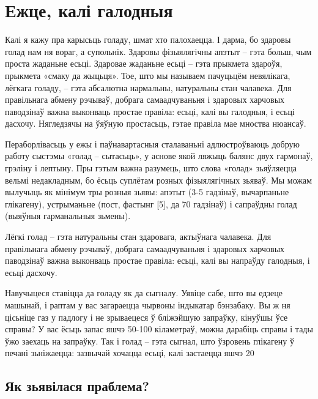 \chapter{Ежце, калі галодныя}

Калі я кажу пра карысьць голаду, шмат хто палохаецца. І дарма, бо здаровы голад нам ня вораг, а супольнік. Здаровы фізыялягічны апэтыт – гэта больш, чым проста жаданьне есьці. Здаровае жаданьне есьці – гэта прыкмета здароўя, прыкмета «смаку да жыцьця». Тое, што мы называем пачуцьцём невялікага, лёгкага голаду, – гэта абсалютна нармальны, натуральны стан чалавека. Для правільнага абмену рэчываў, добрага самаадчуваньня і здаровых харчовых паводзінаў важна выконваць простае правіла: есьці, калі вы галодныя, і есьці дасхочу. Нягледзячы на ўяўную простасьць, гэтае правіла мае мноства нюансаў.

Пераборлівасьць у ежы і паўнавартасныя сталаваньні адлюстроўваюць добрую работу сыстэмы «голад – сытасьць», у аснове якой ляжыць балянс двух гармонаў, грэліну і лептыну. Пры гэтым важна разумець, што слова «голад» зьяўляецца вельмі недакладным, бо ёсьць суплётам розных фізыялягічных зьяваў. Мы можам вылучыць як мінімум тры розныя зьявы: апэтыт (3-5 гадзінаў, вычарпаньне глікагену), устрыманьне (пост, фастынг [5], да 70 гадзінаў) і сапраўдны голад (выяўныя гарманальныя зьмены).

Лёгкі голад – гэта натуральны стан здаровага, актыўнага чалавека. Для правільнага абмену рэчываў, добрага самаадчуваньня і здаровых харчовых паводзінаў важна выконваць простае правіла: есьці, калі вы напраўду галодныя, і есьці дасхочу.

Навучыцеся ставіцца да голаду як да сыгналу. Уявіце сабе, што вы едзеце машынай, і раптам у вас загараецца чырвоны індыкатар бэнзабаку. Вы ж ня цісьніце газ у падлогу і не зрываецеся ў бліжэйшую запраўку, кінуўшы ўсе справы? У вас ёсьць запас яшчэ 50-100 кіламетраў, можна дарабіць справы і тады ўжо заехаць на запраўку. Так і голад – гэта сыгнал, што ўзровень глікагену ў печані зьніжаецца: зазвычай хочацца есьці, калі застаецца яшчэ 20%

\section{Як зьявілася праблема?}

